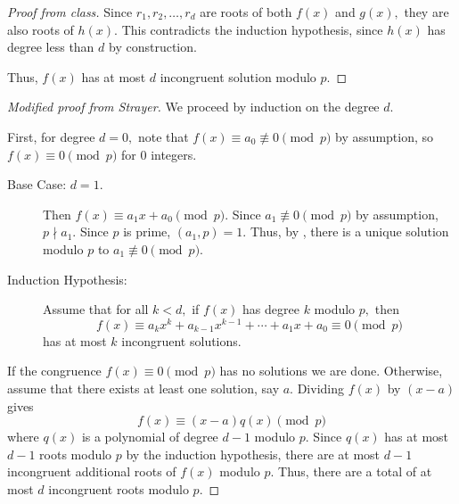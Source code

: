 \documentclass{ximera}
\begin{document}
\begin{theorem}[Lagrange]
\begin{proof}[Proof from class]
        Since $r_1,r_2,\dots,r_d$ are roots of both $f(x)$ and $g(x),$ they are also roots of $h(x).$ This contradicts the induction hypothesis, since $h(x)$ has degree less than $d$ by construction.

        Thus, $f(x)$ has at most $d$ incongruent solution modulo $p.$
    \end{proof}

    \begin{proof}[Modified proof from Strayer]
        We proceed by induction on the degree $d.$
        
        First, for degree $d=0,$ note that $f(x)\equiv a_0\not\equiv 0\pmod{p}$ by assumption, so $f(x)\equiv 0\pmod{p}$ for $0$ integers.
            
        \begin{description}
                
            \item[Base Case: $d=1$.] Then $f(x)\equiv a_1 x+a_0\pmod{p}$. Since $a_1\not\equiv 0\pmod{p}$ by assumption, $p\nmid a_1.$ Since $p$ is prime, $(a_1,p)=1.$ Thus, by , there is a unique solution modulo $p$ to $a_1\not\equiv 0\pmod{p}.$

            \item[Induction Hypothesis:]
            Assume that for all $k\lt d,$ if $f(x)$ has degree $k$ modulo $p,$ then 
            \[f(x)\equiv a_k x^k +a_{k-1}x^{k-1}+\cdots+a_1x+a_0\equiv 0 \pmod{p}\]
            has at most $k$ incongruent solutions.
        \end{description}
        If the congruence $f(x)\equiv 0\pmod{p}$ has no solutions we are done. Otherwise, assume that there exists at least one solution, say $a.$ Dividing $f(x)$ by $(x-a)$ gives 
        \[f(x)\equiv (x-a)q(x)\pmod{p}\]
        where $q(x)$ is a polynomial of degree $d-1$ modulo $p.$
        Since $q(x)$ has at most $d-1$ roots modulo $p$ by the induction hypothesis, there are at most $d-1$ incongruent additional roots of $f(x)$ modulo $p$. Thus, there are a total of at most $d$ incongruent roots modulo $p.$
    \end{proof}
\end{theorem}
\end{document}
